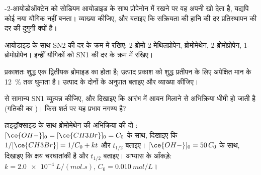 \begin{exercise}[$\star\star$]\label{exo:b1:nucleophilic-substitution:7}
-2-आयोडोऑक्टेन को सोडियम आयोडाइड के साथ प्रोपेनोन में रखने पर वह अपनी  खो देता है,
यद्यपि कोई नया यौगिक नहीं बनता। व्याख्या कीजिए, और बताइए कि
सक्रियता की हानि की दर प्रतिस्थापन की दर की दुगुनी क्यों है।
\end{exercise}

\begin{exercise}[$\star\star$]\label{exo:b1:nucleophilic-substitution:8}
आयोडाइड के साथ SN2 की दर के क्रम में रखिए: 2-ब्रोमो-2-मेथिलप्रोपेन, ब्रोमोमेथेन,
2-ब्रोमोप्रोपेन, 1-ब्रोमोप्रोपेन। इन्हीं यौगिकों को SN1
 की दर के क्रम में रखिए।
\end{exercise}

\begin{exercise}[$\star\star$]\label{exo:b1:nucleophilic-substitution:9}
प्रकाशतः शुद्ध एक द्वितीयक ब्रोमाइड का  होता है; उत्पाद
प्रकाश को शुद्ध प्रतीपन के लिए अपेक्षित मान के \qty{12}{\percent} तक घुमाता है।
उत्पाद के दोनों  के अनुपात बताइए और
व्याख्या कीजिए।
\end{exercise}

\begin{exercise}[$\star\star\star$]\label{exo:b1:nucleophilic-substitution:10}
 से सामान्य SN1  व्युत्पन्न कीजिए, और
दिखाइए कि आरंभ में  आयन  मिलाने से अभिक्रिया
धीमी हो जाती है (गतिकी का )। किस शर्त पर
यह प्रभाव नगण्य है?
\end{exercise}

\begin{exercise}[$\star\star\star$]\label{exo:b1:nucleophilic-substitution:11}
हाइड्रॉक्साइड के साथ ब्रोमोमेथेन की अभिक्रिया की दो :
$[\ce{OH-}]_0 = [\ce{CH3Br}]_0 = C_0$ के साथ, दिखाइए कि $1/[\ce{CH3Br}] = 1/C_0 +
kt$ और $t_{1/2}$ बताइए। $[\ce{OH-}]_0 = 50\,C_0$ के साथ, दिखाइए कि
क्षय चरघातांकी है और $t_{1/2}$ बताइए। अभ्यास के आँकड़े: $k =
\qty{2.0e-4}{L/(mol.s)}$, $C_0 = \qty{0.010}{mol/L}$।
\end{exercise}

